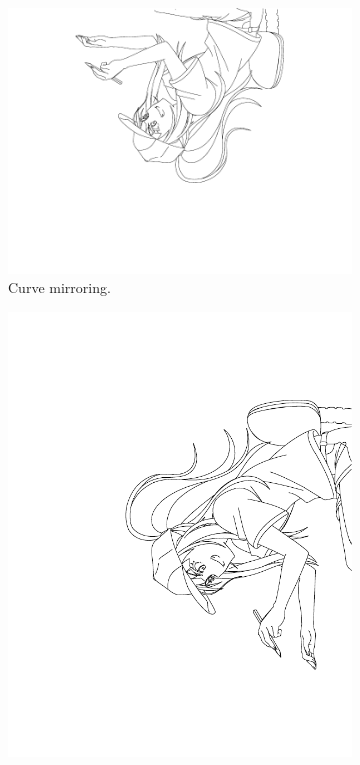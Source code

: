 \begin{figure}
\centering
    \begin{subfigure}{.24\textwidth}
        \includegraphics[width=\textwidth]{graphics/douga/007AD_DOU_27_flip.pdf}
        \caption{Curve mirroring.}
    \end{subfigure}
    \begin{subfigure}{.24\textwidth}
        \includegraphics[width=\textwidth]{graphics/douga/007AD_DOU_27_rotate.pdf}

\end{subfigure}
\end{figure}
